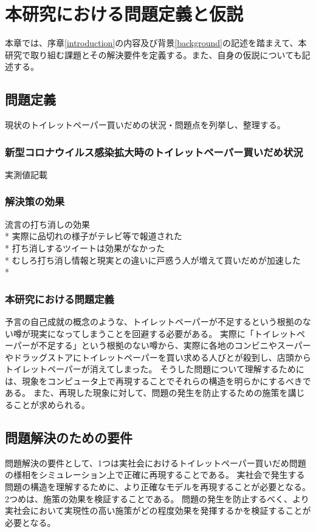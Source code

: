 \chapter{本研究における問題定義と仮説}
\label{issue}

本章では、序章\ref{introduction}の内容及び背景\ref{background}の記述を踏まえて、本研究で取り組む課題とその解決要件を定義する。また、自身の仮説についても記述する。

\section{問題定義}
現状のトイレットペーパー買いだめの状況・問題点を列挙し、整理する。

\subsection{新型コロナウイルス感染拡大時のトイレットペーパー買いだめ状況}

実測値記載

\subsection{解決策の効果}

流言の打ち消しの効果\\*
実際に品切れの様子がテレビ等で報道された\\*
打ち消しするツイートは効果がなかった\\*
むしろ打ち消し情報と現実との違いに戸惑う人が増えて買いだめが加速した\\*

\subsection{本研究における問題定義}
予言の自己成就の概念のような、トイレットペーパーが不足するという根拠のない噂が現実になってしまうことを回避する必要がある。
実際に「トイレットペーパーが不足する」という根拠のない噂から、実際に各地のコンビニやスーパーやドラッグストアにトイレットペーパーを買い求める人びとが殺到し、店頭からトイレットペーパーが消えてしまった。
そうした問題について理解するためには、現象をコンピュータ上で再現することでそれらの構造を明らかにするべきである。
また、再現した現象に対して、問題の発生を防止するための施策を講じることが求められる。

\section{問題解決のための要件}
問題解決の要件として、1つは実社会におけるトイレットペーパー買いだめ問題の様相をシミュレーション上で正確に再現することである。
実社会で発生する問題の構造を理解するために、より正確なモデルを再現することが必要となる。
2つめは、施策の効果を検証することである。
問題の発生を防止するべく、より実社会において実現性の高い施策がどの程度効果を発揮するかを検証することが必要となる。


